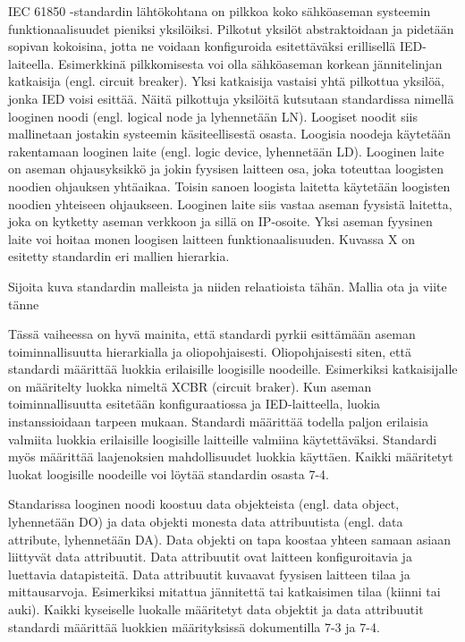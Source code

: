 IEC 61850 -standardin lähtökohtana on pilkkoa koko sähköaseman systeemin funktionaalisuudet pieniksi yksilöiksi. Pilkotut yksilöt abstraktoidaan ja pidetään sopivan kokoisina, jotta ne voidaan konfiguroida esitettäväksi erillisellä IED-laiteella. Esimerkkinä pilkkomisesta voi olla sähköaseman korkean jännitelinjan katkaisija (engl. circuit breaker). Yksi katkaisija vastaisi yhtä pilkottua yksilöä, jonka IED voisi esittää. Näitä pilkottuja yksilöitä kutsutaan standardissa nimellä looginen noodi (engl. logical node ja lyhennetään LN). Loogiset noodit siis mallinetaan jostakin systeemin käsiteellisestä osasta. Loogisia noodeja käytetään rakentamaan looginen laite (engl. logic device, lyhennetään LD). Looginen laite on aseman ohjausyksikkö ja jokin fyysisen laitteen osa, joka toteuttaa loogisten noodien ohjauksen yhtäaikaa. Toisin sanoen loogista laitetta käytetään loogisten noodien yhteiseen ohjaukseen. Looginen laite siis vastaa aseman fyysistä laitetta, joka on kytketty aseman verkkoon ja sillä on IP-osoite. Yksi aseman fyysinen laite voi hoitaa monen loogisen laitteen funktionaalisuuden. Kuvassa X on esitetty standardin eri mallien hierarkia.

\begin{it}
	Sijoita kuva standardin malleista ja niiden relaatioista tähän. Mallia ota ja viite tänne \cite[s.~2]{Camachi2017} \cite[s.~24]{IEC61850-1}
\end{it}

Tässä vaiheessa on hyvä mainita, että standardi pyrkii esittämään aseman toiminnallisuutta hierarkialla ja oliopohjaisesti. Oliopohjaisesti siten, että  standardi määrittää luokkia erilaisille loogisille noodeille. Esimerkiksi katkaisijalle on määritelty luokka nimeltä XCBR (circuit braker). Kun aseman toiminnallisuutta esitetään konfiguraatiossa ja IED-laitteella, luokia instanssioidaan tarpeen mukaan. Standardi määrittää todella paljon erilaisia valmiita luokkia erilaisille loogisille laitteille valmiina käytettäväksi. Standardi myös määrittää laajenoksien mahdollisuudet luokkia käyttäen. Kaikki määritetyt luokat loogisille noodeille voi löytää standardin osasta 7-4. 

Standarissa looginen noodi koostuu data objekteista (engl. data object, lyhennetään DO) ja data objekti monesta data attribuutista (engl. data attribute, lyhennetään DA). Data objekti on tapa koostaa yhteen samaan asiaan liittyvät data attribuutit. Data attribuutit ovat laitteen konfiguroitavia ja luettavia datapisteitä. Data attribuutit kuvaavat fyysisen laitteen tilaa ja mittausarvoja. Esimerkiksi mitattua jännitettä tai katkaisimen tilaa (kiinni tai auki). Kaikki kyseiselle luokalle määritetyt data objektit ja data attribuutit standardi määrittää luokkien määrityksissä dokumentilla 7-3 ja 7-4.

